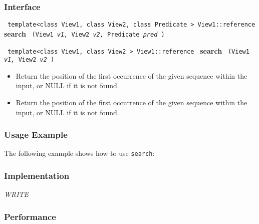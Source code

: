 \subsubsection{Interface} %

\noindent
\texttt{%
template<class View1, class View2, class Predicate >
\newline
View1::reference 
}
\newline
\textbf{search}%
\texttt{%
(View1 
\textit{v1,}%
View2 
\textit{v2,}%
Predicate 
\textit{pred}%
)
}
\vspace{0.4cm}

\noindent
\texttt{%
template<class View1, class View2 >
\newline
View1::reference 
}
\newline
\textbf{search}%
\texttt{%
(View1 
\textit{v1,}%
View2 
\textit{v2}%
)
}

\begin{itemize}
\item
Return the position of the first occurrence of the given sequence within the input, or NULL if it is not found. 
\item
Return the position of the first occurrence of the given sequence within the input, or NULL if it is not found. 
\end{itemize}

\subsubsection{Usage Example} %

The following example shows how to use \texttt{search}:

 
\subsubsection{Implementation} %

\textit{WRITE}

\subsubsection{Performance} %

